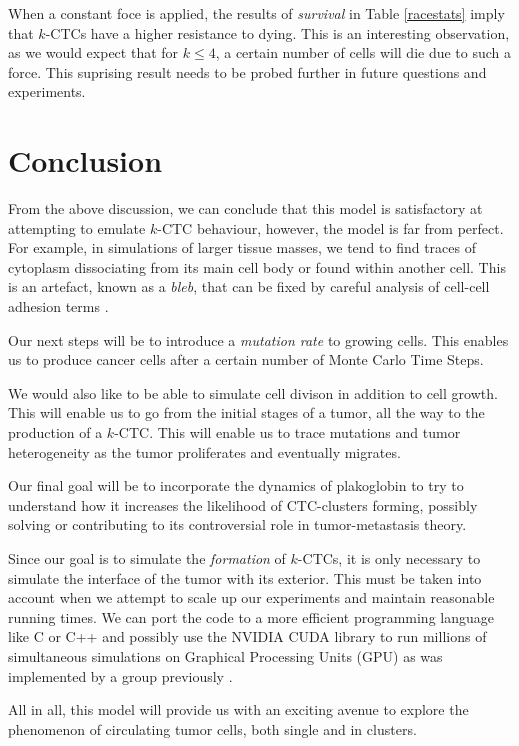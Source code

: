 \documentclass[12pt]{article}
\begin{document}
When a constant foce is applied, the results of \emph{survival} in Table \ref{racestats} imply that $k$-CTCs have a higher resistance to dying. This is an interesting observation, as  we would expect that for $k\leq4$, a certain number of cells will die due to such a force. This suprising result needs to be probed further in future questions and experiments.

\section{Conclusion}

From the above discussion, we can conclude that this model is satisfactory at attempting to emulate $k$-CTC behaviour, however, the model is far from perfect. For example, in simulations of larger tissue masses, we tend to find traces of cytoplasm dissociating from its main cell body or found within another cell. This is an artefact, known as a \emph{bleb}, that can be fixed by careful analysis of cell-cell adhesion terms \cite{Glazier2007}.

Our next steps will be to introduce a \emph{mutation rate} to growing cells. This enables us to produce cancer cells after a certain number of Monte Carlo Time Steps.

We would also like to be able to simulate cell divison in addition to cell growth. This will enable us to go from the initial stages of a tumor, all the way to the production of a $k$-CTC. This will enable us to trace mutations and tumor heterogeneity as the tumor proliferates and eventually migrates.

Our final goal will be to incorporate the dynamics of plakoglobin to try to understand how it increases the likelihood of CTC-clusters forming, possibly solving or contributing to its controversial role in tumor-metastasis theory.

Since our goal is to simulate the \emph{formation} of $k$-CTCs, it is only necessary to simulate the interface of the tumor with its exterior. This must be taken into account when we attempt to scale up our experiments and maintain reasonable running times. We can port the code to a more efficient programming language like C or C++ and possibly use the NVIDIA CUDA library to run millions of simultaneous simulations on Graphical Processing Units (GPU) as was implemented by a group previously \cite{Tapia2011}. 

All in all, this model will provide us with an exciting avenue to explore the phenomenon of circulating tumor cells, both single and in clusters. 
\end{document}
